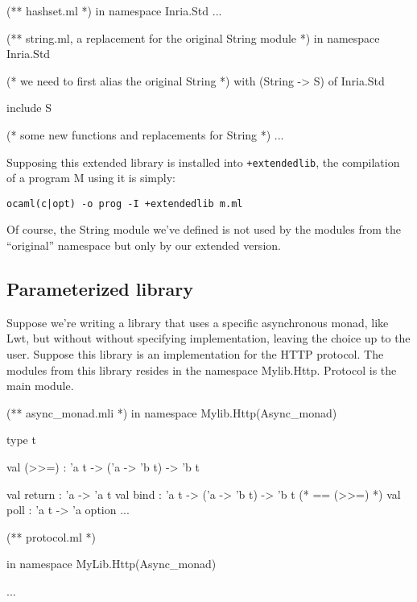 \documentclass[11pt,a4paper]{article}
\begin{document}
\begin{OCaml}
(** hashset.ml *)
in namespace Inria.Std
...
\end{OCaml}

\begin{OCaml}
(** string.ml, a replacement for the original String module *)
in namespace Inria.Std

(* we need to first alias the original String *)
  with (String -> S) of Inria.Std

include S

(* some new functions and replacements for String *)
...
\end{OCaml}

Supposing this extended library is installed into \texttt{+extendedlib}, the
compilation of a program M using it is simply:
\begin{verbatim}
ocaml(c|opt) -o prog -I +extendedlib m.ml
\end{verbatim}

Of course, the String module we've defined is not used by the modules from the
``original'' namespace but only by our extended version.

\subsection{Parameterized library}

Suppose we're writing a library that uses a specific asynchronous monad, like
Lwt, but without without specifying implementation, leaving the choice up to the
user. Suppose this library is an implementation for the HTTP protocol. The modules
from this library resides in the namespace Mylib.Http. Protocol is the main module.

\begin{OCaml}
(** async_monad.mli *)
in namespace Mylib.Http(Async_monad)

type t

val (>>=) : 'a t -> ('a -> 'b t) -> 'b t

val return : 'a -> 'a t
val bind : 'a t -> ('a -> 'b t) -> 'b t (* == (>>=) *)
val poll : 'a t -> 'a option
...
\end{OCaml}

\medskip

\begin{OCaml}
(** protocol.ml *)

in namespace MyLib.Http(Async_monad)

...
\end{OCaml}
\end{document}
